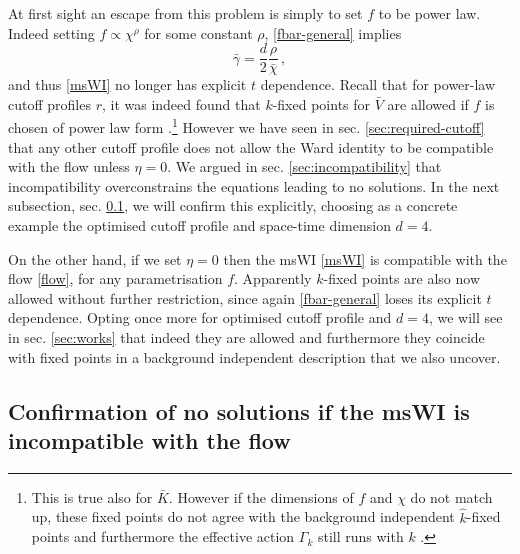 \documentclass[11pt,a4paper]{article}
\numberwithin{figure}{section}
\numberwithin{equation}{section}
\newcommand{\be}{\begin{equation}}
\newcommand{\ee}{\end{equation}}
\newcommand{\bc}{\bar \chi} %
\newcommand{\bV}{\bar V} %
\newcommand{\bg}{\bar \gamma} %
\begin{document}
At first sight an escape from this problem is simply to set $f$ to be power law. Indeed setting $f\propto\chi^{\rho}$
for some constant $\rho$,  \eqref{fbar-general} implies
\be 
\bg = \frac{d}{2} \frac{\rho}{\bc}\,,
\label{powlaw-gamma}
\ee 
and thus \eqref{msWI} no longer has explicit $t$ dependence. 
Recall that for power-law cutoff profiles $r$, it was indeed found that $k$-fixed points for $\bV$ 
are allowed if $f$ is chosen of power law form \cite{Dietz:2015owa}.\footnote{This is true also for $\bar{K}$. However if the dimensions of $f$ and $\chi$
do not match up, %
these fixed points do not agree with the background independent $\hat{k}$-fixed points and furthermore  the effective action $\Gamma_k$ still runs with $k$ \cite{Dietz:2015owa}.} 
However we have seen in sec. \ref{sec:required-cutoff} that any other cutoff profile does not allow the Ward identity to be compatible with the flow unless $\eta=0$. We argued in sec. \ref{sec:incompatibility} that incompatibility overconstrains the equations leading to no solutions. In the next subsection, sec. \ref{sec:incompatible-no-solns}, we will confirm this explicitly, choosing as a concrete example the optimised cutoff profile and space-time dimension $d=4$.

On the other hand, if we set $\eta=0$ then the msWI \eqref{msWI} is compatible with the flow \eqref{flow}, for any parametrisation $f$. Apparently $k$-fixed points are also now allowed without further restriction, since again \eqref{fbar-general} loses its explicit $t$ dependence.  Opting once more for optimised cutoff profile and $d=4$, we will see in sec. \ref{sec:works} that indeed they are allowed and furthermore they coincide with fixed points in a background independent description that we also uncover. 



\subsection{Confirmation of no solutions if the msWI is incompatible with the flow}\label{sec:incompatible-no-solns}
\end{document}
